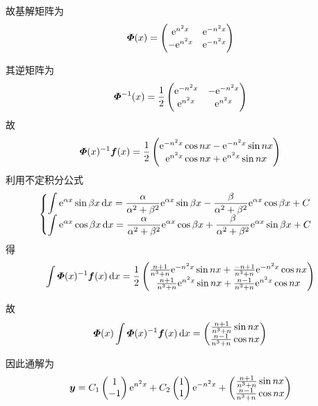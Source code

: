 \begin{solve}
故基解矩阵为
\[\bm{\varPhi}(x)=\begin{pmatrix}\mathrm{e}^{n^2x}&\mathrm{e}^{-n^2x}\\-\mathrm{e}^{n^2x}&\mathrm{e}^{-n^2x}\end{pmatrix}\]

其逆矩阵为
\[\bm{\varPhi}^{-1}(x)=\frac{1}{2}\begin{pmatrix}\mathrm{e}^{-n^2x}&-\mathrm{e}^{-n^2x}\\\mathrm{e}^{n^2x}&\mathrm{e}^{n^2x}\end{pmatrix}\]
故
\[\bm{\varPhi}(x)^{-1}\bm{f}(x)=\frac{1}{2}\begin{pmatrix}\mathrm{e}^{-n^2x}\cos nx-\mathrm{e}^{-n^2x}\sin nx\\\mathrm{e}^{n^2x}\cos nx+\mathrm{e}^{n^2x}\sin nx\end{pmatrix}\]
利用不定积分公式
\[\begin{cases}\displaystyle
\int\mathrm{e}^{\alpha x}\sin\beta x\,\mathrm{d} x=\frac{\alpha}{\alpha^2+\beta^2}\mathrm{e}^{\alpha x}\sin\beta x-\frac{\beta}{\alpha^2+\beta^2}\mathrm{e}^{\alpha x}\cos\beta x+C\\
\displaystyle\int\mathrm{e}^{\alpha x}\cos\beta x\,\mathrm{d} x=\frac{\alpha}{\alpha^2+\beta^2}\mathrm{e}^{\alpha x}\cos\beta x+\frac{\beta}{\alpha^2+\beta^2}\mathrm{e}^{\alpha x}\sin\beta x+C
\end{cases}\]
得\[\int\bm{\varPhi}(x)^{-1}\bm{f}(x)\,\mathrm{d} x=\frac{1}{2}\begin{pmatrix}\frac{n+1}{n^3+n}\mathrm{e}^{-n^2x}\sin nx+\frac{-n+1}{n^3+n}\mathrm{e}^{-n^2x}\cos nx\\
\frac{n+1}{n^3+n}\mathrm{e}^{n^2x}\sin nx+\frac{n-1}{n^3+n}\mathrm{e}^{n^2x}\cos nx
\end{pmatrix}\]

故\[\bm{\varPhi}(x)\int\bm{\varPhi}(x)^{-1}\bm{f}(x)\,\mathrm{d} x=\begin{pmatrix}\frac{n+1}{n^3+n}\sin nx\\
\frac{n-1}{n^3+n}\cos nx\end{pmatrix}\]

因此通解为
\[\bm{y}=C_1\begin{pmatrix}1\\-1\end{pmatrix}\mathrm{e}^{n^2x}+C_2\begin{pmatrix}1\\1\end{pmatrix}\mathrm{e}^{-n^2x}+\begin{pmatrix}\frac{n+1}{n^3+n}\sin nx\\
\frac{n-1}{n^3+n}\cos nx\end{pmatrix}\]


\end{solve}
